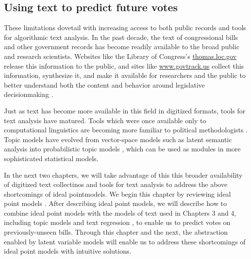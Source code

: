 

\subsection*{Using text to predict future votes}

These limitations dovetail with increasing access to both public
records and tools for algorithmic text analysis.  In the past decade,
the text of congressional bills and other government records has
become readily available to the broad public and research scientists.
Websites like the Library of Congress's \url{thomas.loc.gov} release
this information to the public, and sites like \url{www.govtrack.us}
collect this information, synthesize it, and make it available for
researchers and the public to better understand both the content and
behavior around legislative decisionmaking \citep{govtrack:2009}.

Just as text has become more available in this field in digitized
formats, tools for text analysis have matured.  Tools which were once
available only to computational linguistics are becoming more familiar
to political methodologists \citep{zimmer:2012}.  Topic models have
evolved from vector-space models such as latent semantic analysis
\citep{deerwester:1990} into probabilistic topic models
\citep{hofmann:1999,blei:2003}, which can be used as modules in more
sophisticated statistical models.

In the next two chapters, we will take advantage of this this broader
availability of digitized text collectinos and tools for text analysis
to address the above shortcomings of ideal pointmodels.  We begin this
chapter by reviewing ideal point models
\citep{poole:1985,poole:1991,jackman:2001,martin:2002,clinton:2004}.
After describing ideal point models, we will describe how to combine
ideal point models with the models of text used in Chapters 3 and 4,
including topic models \citep{blei:2003} and text regression \citep{kogan:2009}, to
enable us to predict votes on previously-unseen bills.  Through this
chapter and the next, the abstraction enabled by latent variable
models will enable us to address these shortcomings of ideal point
models with intuitive solutions.

